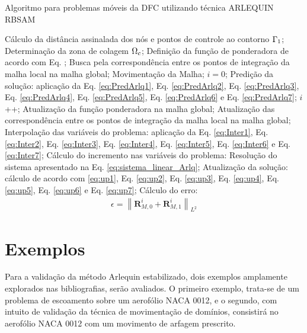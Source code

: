 \documentclass[tese_patricia]{subfiles}
\begin{document}
\begin{algorithm}
	\caption{Algoritmo para problemas móveis da DFC utilizando técnica ARLEQUIN RBSAM}
	\label{alg:fluid_temporalIntegrationARLQ}
	\begin{algorithmic}[1]
		\State Cálculo da distância assinalada dos nós e pontos de controle ao contorno $\Gamma_{1}$;
		\State Determinação da zona de colagem $\Omega_c$;
		\State Definição da função de ponderadora de acordo com Eq. ;
		\State Busca pela correspondência entre os pontos de integração da malha local na malha global;
		\State Movimentação da Malha;
		\State $i=0$;
		\State Predição da solução: aplicação da Eq. \eqref{eq:PredArlq1}, Eq. \eqref{eq:PredArlq2}, Eq. \eqref{eq:PredArlq3},
		Eq. \eqref{eq:PredArlq4}, Eq. \eqref{eq:PredArlq5}, Eq. \eqref{eq:PredArlq6} e Eq. \eqref{eq:PredArlq7};
		\State $i$++;
		\State Atualização da função ponderadora na malha global;
		\State Atualização das correspondência entre os pontos de integração da malha local na malha global;
		\State Interpolação das variáveis do problema: aplicação da Eq. \eqref{eq:Inter1}, Eq. \eqref{eq:Inter2}, Eq. \eqref{eq:Inter3},
		Eq. \eqref{eq:Inter4}, Eq. \eqref{eq:Inter5}, Eq. \eqref{eq:Inter6} e Eq. \eqref{eq:Inter7}; 
		\State Cálculo do incremento nas variáveis do problema: Resolução do sistema apresentado na Eq. \eqref{eq:sistema_linear_Arlq};
		\State Atualização da solução: cálculo de acordo com \eqref{eq:up1}, Eq. \eqref{eq:up2}, Eq. \eqref{eq:up3},
		Eq. \eqref{eq:up4}, Eq. \eqref{eq:up5}, Eq. \eqref{eq:up6} e Eq. \eqref{eq:up7};
		\State Cálculo do erro:
		\begin{align}
			\epsilon =\left\| \mathbf{R}_{M,0}^{i} + \mathbf{R}_{M,1}^{i}  \right\|_{L^2}
		\end{align}
		\EndWhile
		\EndFor
	\end{algorithmic}
\end{algorithm}


\section{Exemplos}

Para a validação da método Arlequin estabilizado, dois exemplos amplamente explorados nas bibliografias, serão avaliados. O primeiro exemplo, trata-se de um problema de escoamento sobre um aerofólio NACA 0012, e o segundo, com intuito de validação da técnica de movimentação de domínios, consistirá no aerofólio NACA 0012 com um movimento de arfagem prescrito. 
\end{document}
